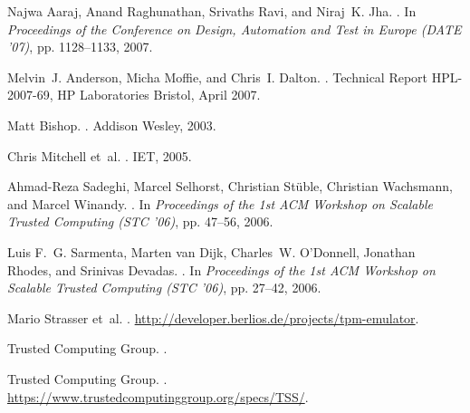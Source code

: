 \documentclass[runningheads]{llncs}
\begin{document}
\begin{thebibliography}{10}

Najwa Aaraj, Anand Raghunathan, Srivaths Ravi, and Niraj~K. Jha.
.
\newblock In {\em Proceedings of the Conference on Design, Automation and Test
  in Europe (DATE '07)}, pp. 1128--1133, 2007.

Melvin~J. Anderson, Micha Moffie, and Chris~I. Dalton.
.
\newblock Technical Report HPL-2007-69, HP Laboratories Bristol, April 2007.

Matt Bishop.
.
\newblock Addison Wesley, 2003.


Chris Mitchell et~al.
.
\newblock IET, 2005.

Ahmad-Reza Sadeghi, Marcel Selhorst, Christian St\"{u}ble, Christian Wachsmann,
  and Marcel Winandy.
.
\newblock In {\em Proceedings of the 1st ACM Workshop on Scalable Trusted
  Computing (STC '06)}, pp. 47--56, 2006.

Luis F.~G. Sarmenta, Marten van Dijk, Charles~W. O'Donnell, Jonathan Rhodes,
  and Srinivas Devadas.
.
\newblock In {\em Proceedings of the 1st ACM Workshop on Scalable Trusted
  Computing (STC '06)}, pp. 27--42, 2006.

Mario Strasser et~al.
.
\newblock \newline\url{http://developer.berlios.de/projects/tpm-emulator}.

{Trusted Computing Group}.
.

{Trusted Computing Group}.
.
\newblock \newline\url{https://www.trustedcomputinggroup.org/specs/TSS/}.


\end{thebibliography}
\end{document}
